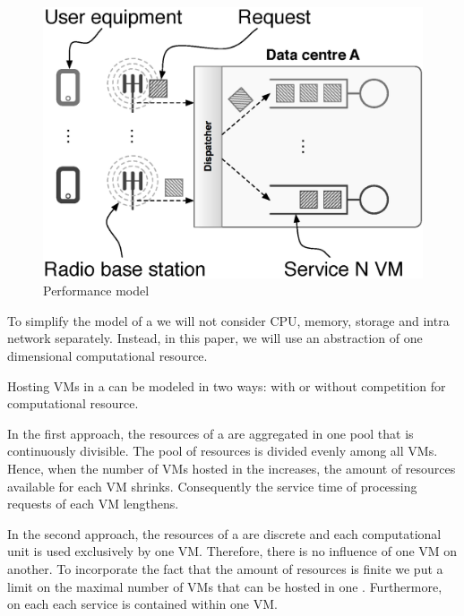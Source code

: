 \subsection{\Dc}
\begin{figure}[tb]
	\centering
	\includegraphics[width=\linewidth]{dc_model.eps} 
	\caption{Performance model}
	\label{fig:performance_model}
\end{figure}

To simplify the model of a \dc{} we will not consider CPU, memory, storage and intra \dc{} network separately.
Instead, in this paper, we will use an abstraction of one dimensional computational resource.

Hosting VMs in a \dc{} can be modeled in two ways: with or without competition for computational resource.

In the first approach, the resources of a \dc{} are aggregated in one pool that is continuously divisible.
The pool of resources is divided evenly among all VMs.
Hence, when the number of VMs hosted in the \dc{} increases, the amount of resources available for each VM shrinks.
Consequently the service time of processing requests of each VM lengthens.

In the second approach, the resources of a \dc{} are discrete and each computational unit is used exclusively by one VM.
Therefore, there is no influence of one VM on another.
To incorporate the fact that the amount of resources is finite we put a limit on the maximal number of VMs that can be hosted in one \dc{}.
Furthermore, on each \dc each service is contained within one VM. 

